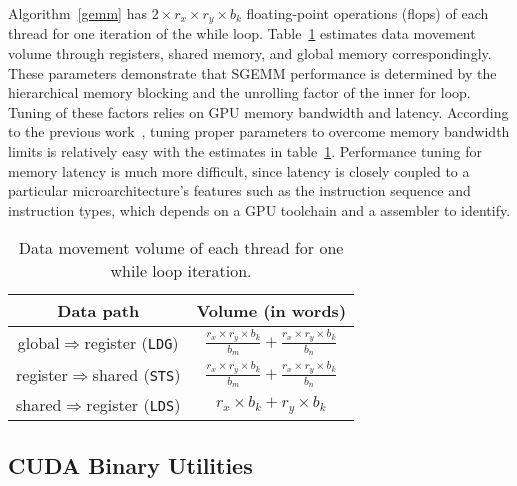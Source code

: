 Algorithm~\ref{gemm} has $2\times r_x \times r_y \times b_k$ floating-point operations (flops) of each thread for one iteration of the while loop.
Table~\ref{tab:dm} estimates data movement volume through registers, shared memory, and global 
memory correspondingly.
These parameters demonstrate that SGEMM performance is determined by the hierarchical memory blocking and the unrolling factor of the inner for loop.
Tuning of these factors relies on GPU memory bandwidth and latency. 
According to the previous work~\cite{magma,tan}, tuning proper parameters to overcome memory bandwidth limits is relatively easy with the estimates in table~\ref{tab:dm}.
Performance tuning for memory latency is much more difficult, since latency is closely coupled to a particular microarchitecture's features such as the instruction sequence and instruction types, which depends on a GPU toolchain and a assembler to identify. 
\begin{table}[htbp]
    \caption{ Data movement volume of each thread for one while loop iteration.} %
\centering
\scalebox{0.8} {
\begin{tabular}{|c|c|}
\hline
    Data path& Volume (in words)\\
\hline
    global$\Rightarrow$register ({\tt LDG})& $\frac{r_x \times r_y \times b_k}{b_m} + \frac{r_x\times r_y \times b_k}{b_n}$ \\
\hline
register$\Rightarrow$shared ({\tt STS})& $\frac{r_x \times r_y \times b_k}{b_m} + \frac{r_x\times r_y \times b_k}{b_n}$ \\
\hline
shared$\Rightarrow$register ({\tt LDS})& $r_x\times b_k + r_y\times b_k$\\
\hline
\end{tabular}
}
\label{tab:dm}
\end{table}



\subsection{CUDA Binary Utilities}
\label{sec:cuda}

